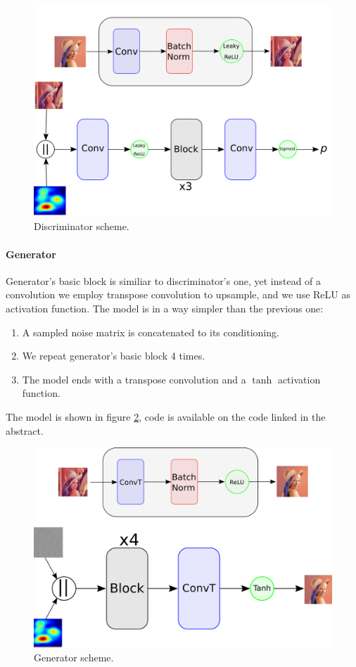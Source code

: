 \documentclass[10pt,twocolumn,letterpaper]{article}
\begin{document}
\begin{figure}[h!t]
   \centering
   \includegraphics[scale=0.25]{images/discr.png}
   \caption{Discriminator scheme.}
   \label{fig:discriminator}
\end{figure}

\paragraph{Generator}
Generator's basic block is similiar to discriminator's one, yet instead of a convolution we employ transpose convolution to upsample, and we use ReLU as activation function.
The model is in a way simpler than the previous one:
\begin{enumerate}
   \item A sampled noise matrix is concatenated to its conditioning.
   \item We repeat generator's basic block 4 times.
   \item The model ends with a transpose convolution and a $\tanh$ activation function.
\end{enumerate}
The model is shown in figure \ref{fig:generator}, code is available on the code linked in the abstract.

\begin{figure}[h!t]
   \centering
   \includegraphics[scale=0.25]{images/gen.png}
   \caption{Generator scheme.}
   \label{fig:generator}
\end{figure}
\end{document}
